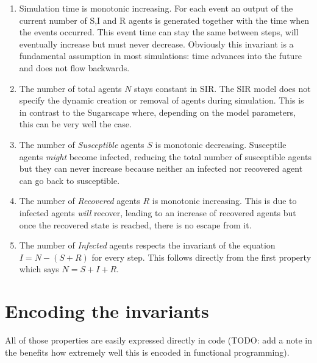 \begin{enumerate}
	\item Simulation time is monotonic increasing. For each event an output of the current number of S,I and R agents is generated together with the time when the events occurred. This event time can stay the same between steps, will eventually increase but must never decrease. Obviously this invariant is a fundamental assumption in most simulations: time advances into the future and does not flow backwards.
	
	\item The number of total agents $N$ stays constant in SIR. The SIR model does not specify the dynamic creation or removal of agents during simulation. This is in contrast to the Sugarscape where, depending on the model parameters, this can be very well the case.
	
	\item The number of \textit{Susceptible} agents $S$ is monotonic decreasing. Susceptile agents \textit{might} become infected, reducing the total number of susceptible agents but they can never increase because neither an infected nor recovered agent can go back to susceptible.
	
	\item The number of \textit{Recovered} agents $R$ is monotonic increasing. This is due to infected agents \textit{will} recover, leading to an increase of recovered agents but once the recovered state is reached, there is no escape from it.
	
	\item The number of \textit{Infected} agents respects the invariant of the equation $I = N - (S + R)$ for every step. This follows directly from the first property which says $N = S + I + R$.
\end{enumerate}

\section{Encoding the invariants}
All of those properties are easily expressed directly in code (TODO: add a note in the benefits how extremely well this is encoded in functional programming).

